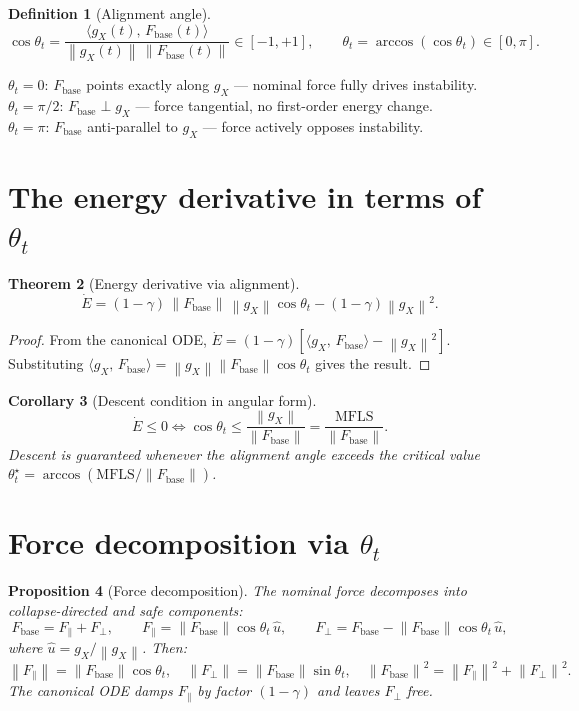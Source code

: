 \documentclass[11pt,a4paper,openany]{book}
\newtheorem{theorem}{Theorem}[chapter]
\newtheorem{proposition}[theorem]{Proposition}
\newtheorem{corollary}[theorem]{Corollary}
\theoremstyle{definition}
\newtheorem{definition}[theorem]{Definition}
\newcommand{\norm}[1]{\left\|#1\right\|}
\newcommand{\inner}[2]{\langle #1,\,#2\rangle}
\newcommand{\Fbase}{F_{\mathrm{base}}}
\newcommand{\gX}{g_X}
\newcommand{\mfls}{\mathrm{MFLS}}
\begin{document}
\begin{definition}[Alignment angle]
\[
\cos\theta_t = \frac{\inner{\gX(t)}{\Fbase(t)}}{\norm{\gX(t)}\,\norm{\Fbase(t)}} \in [-1, +1],
\qquad
\theta_t = \arccos(\cos\theta_t) \in [0, \pi].
\]
\end{definition}

\begin{lockedbox}
$\theta_t = 0$: $\Fbase$ points exactly along $\gX$ --- nominal force fully drives instability.\\
$\theta_t = \pi/2$: $\Fbase \perp \gX$ --- force tangential, no first-order energy change.\\
$\theta_t = \pi$: $\Fbase$ anti-parallel to $\gX$ --- force actively opposes instability.
\end{lockedbox}

\section{The energy derivative in terms of $\theta_t$}

\begin{theorem}[Energy derivative via alignment]
\[
\dot E = (1-\gamma)\,\norm{\Fbase}\,\norm{\gX}\cos\theta_t - (1-\gamma)\norm{\gX}^2.
\]
\end{theorem}

\begin{proof}
From the canonical ODE, $\dot E = (1-\gamma)[\inner{\gX}{\Fbase} - \norm{\gX}^2]$.
Substituting $\inner{\gX}{\Fbase} = \norm{\gX}\norm{\Fbase}\cos\theta_t$ gives the result.
\end{proof}

\begin{corollary}[Descent condition in angular form]
\[
\dot E \leq 0 \iff \cos\theta_t \leq \frac{\norm{\gX}}{\norm{\Fbase}} = \frac{\mfls}{\norm{\Fbase}}.
\]
Descent is guaranteed whenever the alignment angle exceeds the critical value
$\theta_t^\star = \arccos(\mfls/\norm{\Fbase})$.
\end{corollary}

\section{Force decomposition via $\theta_t$}

\begin{proposition}[Force decomposition]
The nominal force decomposes into collapse-directed and safe components:
\[
\Fbase = F_\parallel + F_\perp,
\qquad
F_\parallel = \norm{\Fbase}\cos\theta_t\,\hat u,
\qquad
F_\perp = \Fbase - \norm{\Fbase}\cos\theta_t\,\hat u,
\]
where $\hat u = \gX/\norm{\gX}$. Then:
\[
\norm{F_\parallel} = \norm{\Fbase}\cos\theta_t, \quad
\norm{F_\perp} = \norm{\Fbase}\sin\theta_t, \quad
\norm{\Fbase}^2 = \norm{F_\parallel}^2 + \norm{F_\perp}^2.
\]
The canonical ODE damps $F_\parallel$ by factor $(1-\gamma)$ and leaves $F_\perp$ free.
\end{proposition}
\end{document}

